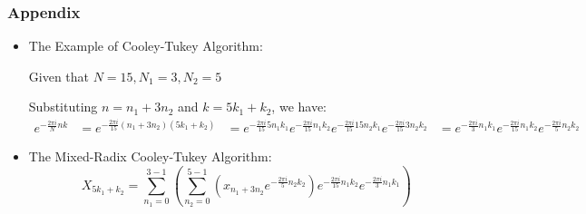\documentclass[xcolor=dvipsnames]{beamer} %
\def\\{}%
\begin{document}
\begin{frame}
    \frametitle{Appendix}
        \begin{itemize}
        \item The Example of Cooley-Tukey Algorithm:    
    
                Given that \(N = 15, N_1 = 3, N_2 = 5\)
    
                Substituting \(n = n_1 + 3n_2\) and \(k = 5k_1 + k_2\), we have:
                \begin{align*}
                e^{-\frac{2\pi i}{N} nk} &= e^{-\frac{2\pi i}{15} (n_1 + 3n_2)(5k_1 + k_2)} \\
                                         &= e^{-\frac{2\pi i}{15} 5n_1 k_1 } e^{-\frac{2\pi i}{15} n_1 k_2} e^{-\frac{2\pi i}{15} 15n_2 k_1} e^{-\frac{2\pi i}{15} 3n_2 k_2} \\
                                         &= e^{-\frac{2\pi i}{3} n_1 k_1 } e^{-\frac{2\pi i}{15} n_1 k_2} e^{-\frac{2\pi i}{5} n_2 k_2}
                \end{align*}
        \end{itemize}
        \begin{itemize}
        \item The Mixed-Radix Cooley-Tukey Algorithm:
                \[
                X_{5k_1 + k_2} = \sum_{n_1=0}^{3-1} \left( \sum_{n_2=0}^{5-1} \left( x_{n_1 + 3n_2} e^{-\frac{2\pi i}{5} n_2 k_2} \right) e^{-\frac{2\pi i}{15} n_1 k_2} e^{-\frac{2\pi i}{3} n_1 k_1} \right)
                \]      
        \end{itemize}
    \end{frame} 
\end{document}
